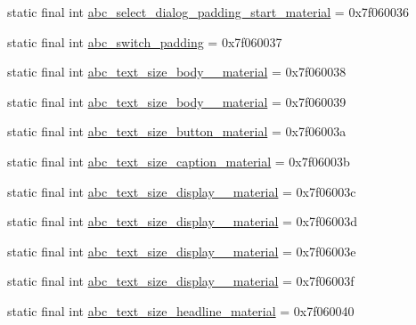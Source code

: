 \begin{DoxyCompactItemize}
\item 
static final int \mbox{\hyperlink{classandroid_1_1support_1_1design_1_1R_1_1dimen_ab58598587f4f5fdc847a95cdc049cf52}{abc\+\_\+select\+\_\+dialog\+\_\+padding\+\_\+start\+\_\+material}} = 0x7f060036
\item 
static final int \mbox{\hyperlink{classandroid_1_1support_1_1design_1_1R_1_1dimen_a68dfff3b44493d46ef4f342fe493b6f1}{abc\+\_\+switch\+\_\+padding}} = 0x7f060037
\item 
static final int \mbox{\hyperlink{classandroid_1_1support_1_1design_1_1R_1_1dimen_ab0b6acfb59c02b2774843fb880ffcf8a}{abc\+\_\+text\+\_\+size\+\_\+body\+\_\+\_\+material}} = 0x7f060038
\item 
static final int \mbox{\hyperlink{classandroid_1_1support_1_1design_1_1R_1_1dimen_a528fe8a33f9ff3e67b652f558ee25c2d}{abc\+\_\+text\+\_\+size\+\_\+body\+\_\+\_\+material}} = 0x7f060039
\item 
static final int \mbox{\hyperlink{classandroid_1_1support_1_1design_1_1R_1_1dimen_a88aed06e5c28e04e97f8b700b4e51593}{abc\+\_\+text\+\_\+size\+\_\+button\+\_\+material}} = 0x7f06003a
\item 
static final int \mbox{\hyperlink{classandroid_1_1support_1_1design_1_1R_1_1dimen_a5cdfadc5f166849cf34b222d8d3f684e}{abc\+\_\+text\+\_\+size\+\_\+caption\+\_\+material}} = 0x7f06003b
\item 
static final int \mbox{\hyperlink{classandroid_1_1support_1_1design_1_1R_1_1dimen_a691b8577be670e47f62cc11833ca1e7b}{abc\+\_\+text\+\_\+size\+\_\+display\+\_\+\_\+material}} = 0x7f06003c
\item 
static final int \mbox{\hyperlink{classandroid_1_1support_1_1design_1_1R_1_1dimen_aa795c05c797d5e84e8e16eae582c74e0}{abc\+\_\+text\+\_\+size\+\_\+display\+\_\+\_\+material}} = 0x7f06003d
\item 
static final int \mbox{\hyperlink{classandroid_1_1support_1_1design_1_1R_1_1dimen_af16a183a043f3ce464a8daec9e04da9a}{abc\+\_\+text\+\_\+size\+\_\+display\+\_\+\_\+material}} = 0x7f06003e
\item 
static final int \mbox{\hyperlink{classandroid_1_1support_1_1design_1_1R_1_1dimen_a8e55855f262f4e761dd55609d351e8af}{abc\+\_\+text\+\_\+size\+\_\+display\+\_\+\_\+material}} = 0x7f06003f
\item 
static final int \mbox{\hyperlink{classandroid_1_1support_1_1design_1_1R_1_1dimen_a2081000949435fecb9964aa41ab05907}{abc\+\_\+text\+\_\+size\+\_\+headline\+\_\+material}} = 0x7f060040
\item 

\end{DoxyCompactItemize}
